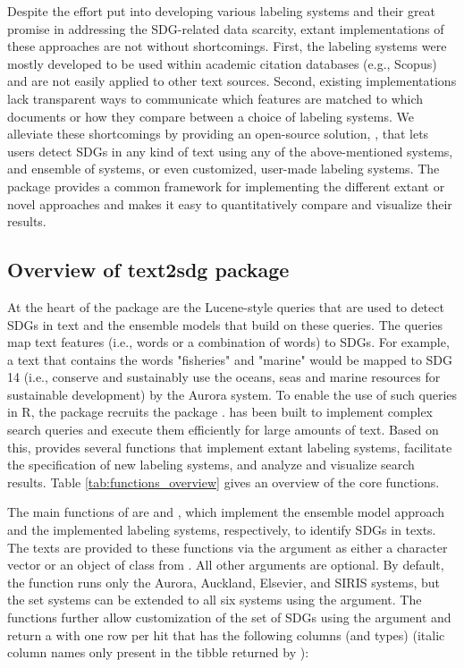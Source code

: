 Despite the effort put into developing various labeling systems and their great promise in addressing the SDG-related data scarcity, extant implementations of these approaches are not without shortcomings. First, the labeling systems were mostly developed to be used within academic citation databases (e.g., Scopus) and are not easily applied to other text sources. Second, existing implementations lack transparent ways to communicate which features are matched to which documents or how they compare between a choice of labeling systems. We alleviate these shortcomings by providing an open-source solution, , that lets users detect SDGs in any kind of text using any of the above-mentioned systems, and ensemble of systems, or even customized, user-made labeling systems. The package provides a common framework for implementing the different extant or novel approaches and makes it easy to quantitatively compare and visualize their results. 

\subsection{Overview of text2sdg package}

At the heart of the  package are the Lucene-style queries that are used to detect SDGs in text and the ensemble models that build on these queries. The queries map text features (i.e., words or a combination of words) to SDGs. For example, a text that contains the words "fisheries" and "marine" would be mapped to SDG 14 (i.e., conserve and sustainably use the oceans, seas and marine resources for sustainable development) by the Aurora system. To enable the use of such queries in R, the  package recruits the  package \citep{corpustools}.  has been built to implement complex search queries and execute them efficiently for large amounts of text. Based on this,  provides several functions that implement extant labeling systems, facilitate the specification of new labeling systems, and analyze and visualize search results. Table \ref{tab:functions_overview} gives an overview of the  core functions. 

The main functions of  are  and , which implement the ensemble model approach \citep{wulff2023using} and the implemented labeling systems, respectively, to identify SDGs in texts. The texts are provided to these functions via the  argument as either a character vector or an object of class  from . All other arguments are optional. By default, the  function runs only the Aurora, Auckland, Elsevier, and SIRIS systems, but the set systems can be extended to all six systems using the  argument. The functions further allow customization of the set of SDGs using the  argument and return a  with one row per hit that has the following columns (and types) (italic column names only present in the tibble returned by ):

